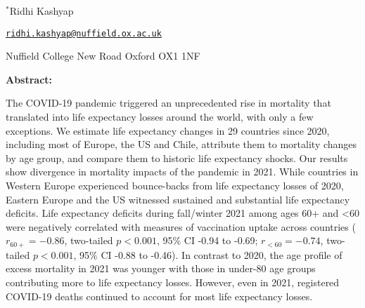 \documentclass[12pt]{article}
\begin{document}
\begin{titlepage}
{\vspace{1em}

$^{*}$Ridhi Kashyap

\href{mailto:ridhi.kashyap@nuffield.ox.ac.uk}{\texttt{ridhi.kashyap@nuffield.ox.ac.uk}}

Nuffield College
New Road
Oxford OX1 1NF

\par\medskip}


\clearpage

{\textbf{Abstract:}\par

The COVID-19 pandemic triggered an unprecedented rise in mortality that translated into life expectancy losses around the world, with only a few exceptions. We estimate life expectancy changes in 29 countries since 2020, including most of Europe, the US and Chile, attribute them to mortality changes by age group, and compare them to historic life expectancy shocks. Our results show divergence in mortality impacts of the pandemic in 2021. While countries in Western Europe experienced bounce-backs from life expectancy losses of 2020, Eastern Europe and the US witnessed sustained and substantial life expectancy deficits. Life expectancy deficits during fall/winter 2021 among ages 60+ and <60 were negatively correlated with measures of vaccination uptake across countries ($r_{60+}=-0.86$, two-tailed $p < 0.001$, 95\% CI -0.94 to -0.69; $r_{<60}=-0.74$, two-tailed $p < 0.001$, 95\% CI -0.88 to -0.46). In contrast to 2020, the age profile of excess mortality in 2021 was younger with those in under-80 age groups contributing more to life expectancy losses. However, even in 2021, registered COVID-19 deaths continued to account for most life expectancy losses.

\par\medskip}

\clearpage

\end{titlepage}


\end{document}
